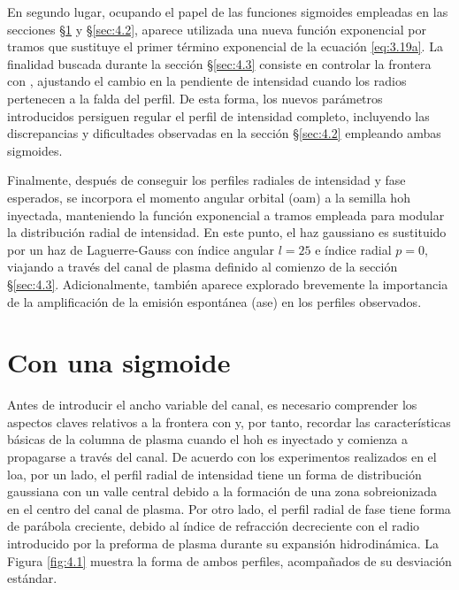 En segundo lugar, ocupando el papel de las funciones sigmoides empleadas en las secciones \S\ref{sec:4.1} y \S\ref{sec:4.2}, aparece utilizada una nueva función exponencial por tramos que sustituye el primer término exponencial de la ecuación \eqref{eq:3.19a}. La finalidad buscada durante la sección \S\ref{sec:4.3} consiste en controlar la frontera con , ajustando el cambio en la pendiente de intensidad cuando los radios pertenecen a la falda del perfil. De esta forma, los nuevos parámetros introducidos persiguen regular el perfil de intensidad completo, incluyendo las discrepancias y dificultades observadas en la sección \S\ref{sec:4.2} empleando ambas sigmoides.

Finalmente, después de conseguir los perfiles radiales de intensidad y fase esperados, se incorpora el momento angular orbital (\acrshort{oam}) a la semilla \acrshort{hoh} inyectada, manteniendo la función exponencial a tramos empleada para modular la distribución radial de intensidad. En este punto, el haz gaussiano es sustituido por un haz de Laguerre-Gauss con índice angular $l=25$ e índice radial $p=0$, viajando a través del canal de plasma definido al comienzo de la sección \S\ref{sec:4.3}. Adicionalmente, también aparece explorado brevemente la importancia de la amplificación de la emisión espontánea (\acrshort{ase}) en los perfiles observados.

\section{Con una sigmoide}\label{sec:4.1}
Antes de introducir el ancho variable del canal, es necesario comprender los aspectos claves relativos a la frontera con  y, por tanto, recordar las características básicas de la columna de plasma cuando el \acrshort{hoh} es inyectado y comienza a propagarse a través del canal. De acuerdo con los experimentos realizados en el \acrshort{loa}\autocite{Tuitje2020}, por un lado, el perfil radial de intensidad tiene un forma de distribución gaussiana con un valle central debido a la formación de una zona sobreionizada en el centro del canal de plasma. Por otro lado, el perfil radial de fase tiene forma de parábola creciente, debido al índice de refracción decreciente con el radio introducido por la preforma de plasma durante su expansión hidrodinámica. La Figura \ref{fig:4.1} muestra la forma de ambos perfiles, acompañados de su desviación estándar.

